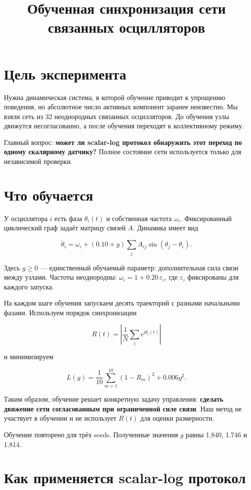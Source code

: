 \documentclass[10pt,a4paper]{article}
\author{}\date{}
\title{Обученная синхронизация сети связанных осцилляторов}
\begin{document}
\maketitle

\section*{Цель эксперимента}

Нужна динамическая система, в которой обучение приводит к упрощению поведения, но абсолютное число активных компонент заранее неизвестно. Мы взяли сеть из 32 неоднородных связанных осцилляторов. До обучения узлы движутся несогласованно, а после обучения переходят к коллективному режиму.

Главный вопрос: \textbf{может ли scalar-log протокол обнаружить этот переход по одному скалярному датчику?} Полное состояние сети используется только для независимой проверки.

\section*{Что обучается}

У осциллятора $i$ есть фаза $\theta_i(t)$ и собственная частота $\omega_i$. Фиксированный циклический граф задаёт матрицу связей $A$. Динамика имеет вид

\[
\dot\theta_i=\omega_i+(0.10+g)\sum_j A_{ij}\sin(\theta_j-\theta_i).
\]

Здесь $g\geq 0$ --- единственный обучаемый параметр: дополнительная сила связи между узлами. Частоты неоднородны: $\omega_i=1+0.20\,\varepsilon_i$, где $\varepsilon_i$ фиксированы для каждого запуска.

На каждом шаге обучения запускаем десять траекторий с разными начальными фазами. Используем порядок синхронизации

\[
R(t)=\left|\frac{1}{N}\sum_i e^{\mathrm{i}\theta_i(t)}\right|
\]

и минимизируем

\[
L(g)=\frac{1}{10}\sum_{m=1}^{10}(1-R_m)^2+0.006g^2.
\]

Таким образом, обучение решает конкретную задачу управления: \textbf{сделать движение сети согласованным при ограниченной силе связи}. Наш метод не участвует в обучении и не использует $R(t)$ для оценки размерности.

Обучение повторено для трёх seeds. Полученные значения $g$ равны 1.840, 1.746 и 1.814.

\section*{Как применяется scalar-log протокол}
\end{document}
